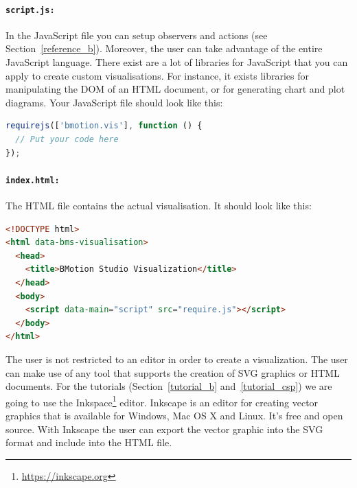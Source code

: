 \paragraph{\texttt{script.js:}}
In the JavaScript file you can setup observers and actions (see Section~\ref{reference_b}).
Moreover, the user can take advantage of the entire JavaScript language.
There exist are a lot of libraries for JavaScript that you can apply to create custom visualisations.
For instance, it exists libraries for manipulating the DOM of an HTML document, or for generating chart and plot diagrams.
Your JavaScript file should look like this:

\begin{lstlisting}[language=JavaScript]
requirejs(['bmotion.vis'], function () {
  // Put your code here
});
\end{lstlisting}


\paragraph{\texttt{index.html:}}
The HTML file contains the actual visualisation.
It should look like this:

\begin{lstlisting}[language=html]
<!DOCTYPE html>
<html data-bms-visualisation>
  <head>
    <title>BMotion Studio Visualization</title>
  </head>
  <body>
    <script data-main="script" src="require.js"></script>
  </body>
</html>
\end{lstlisting}


The user is not restricted to an editor in order to create a visualization.
The user can make use of any tool that supports the creation of SVG graphics or HTML documents.
For the tutorials (Section~\ref{tutorial_b} and~\ref{tutorial_csp}) we are going to use the Inkspace\footnote{\url{https://inkscape.org}} editor. Inkscape is an editor for creating vector graphics that is available for Windows, Mac OS X and Linux.
It's free and open source.
With Inkscape the user can export the vector graphic into the SVG format and include into the HTML file.


